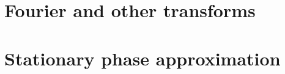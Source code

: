 \documentclass[12pt]{report}
\theoremstyle{definition}
\begin{document}
\chapter{Fourier and other transforms}
\label{chap:fourier-transforms}


\chapter{Stationary phase approximation}
\label{chap:stationary-phase}


\cleardoublepage 
  
\end{document}
